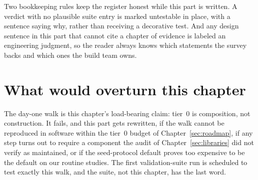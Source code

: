 Two bookkeeping rules keep the register honest while this part is
written. A verdict with no plausible suite entry is marked
untestable in place, with a sentence saying why, rather than
receiving a decorative test. And any design sentence in this part
that cannot cite a chapter of evidence is labeled an engineering
judgment, so the reader always knows which statements the survey
backs and which ones the build team owns.

\section{What would overturn this chapter}

The day-one walk is this chapter's load-bearing claim: tier~0 is
composition, not construction. It fails, and this part gets
rewritten, if the walk cannot be reproduced in software within the
tier~0 budget of Chapter~\ref{sec:roadmap}, if any step turns out to
require a component the audit of Chapter~\ref{sec:libraries} did not
verify as maintained, or if the seed-protocol default proves too
expensive to be the default on our routine studies. The first
validation-suite run is scheduled to test exactly this walk, and the
suite, not this chapter, has the last word.
